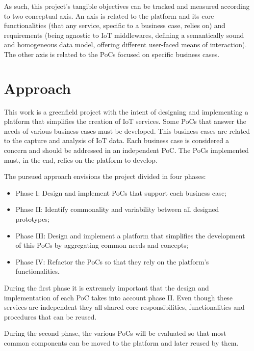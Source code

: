 As such, this project's tangible objectives can be tracked and measured according to two conceptual axis.
An axis is related to the platform and its core functionalities (that any service, specific to a business case, relies on) and requirements (being agnostic to \gls{IoT} middlewares, defining a semantically sound and homogeneous data model, offering different user-faced means of interaction). The other axis is related to the \gls{PoC}s focused on specific business cases.

\section{Approach}
\label{sec:introduction:approach}

This work is a greenfield project with the intent of designing and implementing a platform that simplifies the creation of \gls{IoT} services. Some \gls{PoC}s that answer the needs of various business cases must be developed. This business cases are related to the capture and analysis of \gls{IoT} data.
Each business case is considered a concern and should be addressed in an independent \gls{PoC}.
The \gls{PoC}s implemented must, in the end, relies on the platform to develop.

The pursued approach envisions the project divided in four phases:

\begin{itemize}
    \item Phase I: Design and implement \gls{PoC}s that support each business case;
    \item Phase II: Identify commonality and variability between all designed prototypes;
    \item Phase III: Design and implement a platform that simplifies the development of this \gls{PoC}s by aggregating common needs and concepts;
    \item Phase IV: Refactor the \gls{PoC}s so that they rely on the platform's functionalities.
\end{itemize}

During the first phase it is extremely important that the design and implementation of each \gls{PoC} takes into account phase II. Even though these services are independent they all shared core responsibilities, functionalities and procedures that can be reused.

During the second phase, the various \gls{PoC}s will be evaluated so that most common components can be moved to the platform and later reused by them.

